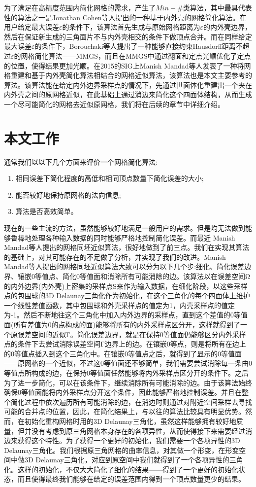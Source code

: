 为了满足在高精度范围内简化网格的需求，产生了$Min−\#$类算法，其中最具代表性的算法之一是Jonathan Cohen等人提出的一种基于内外壳的网格简化算法\cite{simp-envlop}。在用户给定最大误差$\varepsilon$的条件下，该算法首先生成与原始网格距离为$\varepsilon$的内外壳边界，然后在保证新生成的三角面片不与内外壳相交的条件下做顶点合并。而在同样给定最大误差$\varepsilon$的条件下，Borouchaki等人提出了一种能够直接约束Hausdorff距离不超过$\varepsilon$的网格简化算法——MMGS，而且在MMGS中通过翻面和定点光顺优化了定点的位置，使得结果更加光顺。在2015的SIG上Manish Mandad等人发表了一种将网格重建和基于内外壳简化算法相结合的网格近似算法，该算法也是本文主要参考的算法。该算法能在给定内外边界采样点的情况下，先通过世面体化重建出一个夹在内外壳之间的原网格近似，在此基础上通过消边来简化这个四面体结构，从而生成一个尽可能简化的网格去近似原网格，我们将在后续的章节中详细介绍。
\section{本文工作}
通常我们以以下几个方面来评价一个网格简化算法:
\begin{enumerate}
\item 相同误差下简化程度的高低和相同顶点数量下简化误差的大小;
\item 能否较好地保持原网格的法向信息;
\item 算法是否高效简单。
\end{enumerate}
现在的一些主流的方法，虽然能够较好地满足一般用户的需求。但是均无法做到能够鲁棒地处理各种输入数据的同时能够严格地控制简化误差。而最近 Manish Mandad等人提出的网格同坯近似算法，很好地做到了前三点。我们在实现其算法的基础上，对其可能存在的不足做了分析，并实现了我们的改进。Manish Mandad等人提出的网格同坯近似算法大致可以分为以下几个步:细化、简化误差边界、镶嵌0等值点、简化0等值面和消除所有可能消除的边。该算法以在误差空间Ω的内外边界(内外壳)上密集的采样点S来作为输入数据，在细化阶段，以这些采样点的包围球的3D Delaunay三角化作为初始化，在这个三角化的每个四面体上维护一个线性差值函数，其中包围球和外壳采样点的值定为1，内壳采样点的值定为-1。然后不断地往这个三角化中加入内外边界的采样点，直到这个差值的0等值面(所有差值为0的点构成的面)能够将所有的内外采样点区分开，这样就得到了一个原误差空间的近似Γ。简化误差边界，就是在保持0等值面仍能够区分内外采样点的条件下去尝试消除误差空间Γ边界上的边。在镶嵌0等点，则是将所有在边上的0等值点插入到这个三角化中。在镶嵌0等值点之后，就得到了显示的0等值面——原网格的一个近似，不过这0等值面还不够简单，我们需要尝试消除每一条由0等值点所构成的边，在保持0等值面任然能够将内外采样点区分开的条件下。之后为了进一步简化，可以在该条件下，继续消除所有可能消除的边。由于该算法始终确保0等值面能将内外采样点分开这个条件，因此能够严格地控制误差。并且在整个简化过程中依次遍历所有可能消除的边，在消边时则通过对附近空间采样去寻找可能的合并点的位置，因此，在简化结果上，与以往的算法比较具有明显优势。然而，在初始化重构网格时用的3D Delaunay三角化，虽然这样能够拥有较好地质量，但并没有考虑到原三角网格本身存在的各项异性，从而使得接下来需要经过消边来获得这个特性。为了获得一个更好的初始化，我们需要一个各项异性的3D Delaunay三角化。我们根据原三角网格的曲率信息，对其做一个形变，在形变空间中做3D Delaunay三角化，对应到原空间中我们就得到了一个各项异性的三角化。这样的初始化，不仅大大简化了细化的结果——得到了一个更好的初始化状态，而且使得最终我们能够在给定的误差范围内得到一个顶点数量更少的结果。
